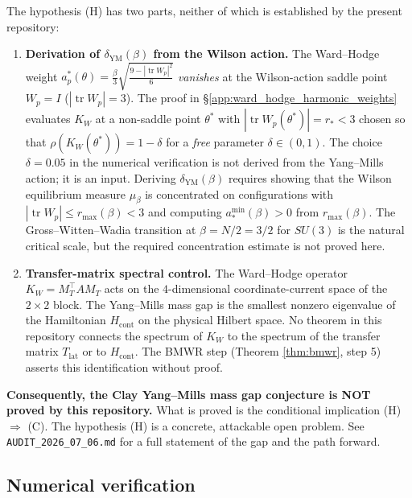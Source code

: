 The hypothesis (H) has two parts, neither of which is established
by the present repository:

\begin{enumerate}
\item \textbf{Derivation of $\delta_{\mathrm{YM}}(\beta)$ from the
Wilson action.} The Ward--Hodge weight
$a_{p}^{*}(\theta)=\frac{\beta}{3}\sqrt{\frac{9-|\operatorname{tr}W_{p}|^{2}}{6}}$
\emph{vanishes} at the Wilson-action saddle point
$W_{p}=I$ ($|\operatorname{tr}W_{p}|=3$). The proof in
\S\ref{app:ward_hodge_harmonic_weights} evaluates $K_{W}$ at a
non-saddle point $\theta^{*}$ with
$|\operatorname{tr}W_{p}(\theta^{*})|=r_{*}<3$ chosen so that
$\rho(K_{W}(\theta^{*}))=1-\delta$ for a \emph{free} parameter
$\delta\in(0,1)$. The choice $\delta=0.05$ in the numerical
verification is not derived from the Yang--Mills action; it is an
input. Deriving $\delta_{\mathrm{YM}}(\beta)$ requires showing that
the Wilson equilibrium measure $\mu_{\beta}$ is concentrated on
configurations with $|\operatorname{tr}W_{p}|\le r_{\max}(\beta)<3$
and computing $a_{*}^{\min}(\beta)>0$ from $r_{\max}(\beta)$. The
Gross--Witten--Wadia transition at $\beta=N/2=3/2$ for $SU(3)$ is
the natural critical scale, but the required concentration estimate
is not proved here.

\item \textbf{Transfer-matrix spectral control.} The Ward--Hodge
operator $K_{W}=M_{T}^{\top}AM_{T}$ acts on the $4$-dimensional
coordinate-current space of the $2\times 2$ block. The Yang--Mills
mass gap is the smallest nonzero eigenvalue of the Hamiltonian
$H_{\mathrm{cont}}$ on the physical Hilbert space. No theorem in
this repository connects the spectrum of $K_{W}$ to the spectrum of
the transfer matrix $T_{\mathrm{lat}}$ or to $H_{\mathrm{cont}}$.
The BMWR step (Theorem \ref{thm:bmwr}, step 5) asserts this
identification without proof.
\end{enumerate}

\textbf{Consequently, the Clay Yang--Mills mass gap conjecture is
NOT proved by this repository.} What is proved is the conditional
implication (H) $\Rightarrow$ (C). The hypothesis (H) is a concrete,
attackable open problem. See \texttt{AUDIT\_2026\_07\_06.md} for a
full statement of the gap and the path forward.

\subsection{Numerical verification}

